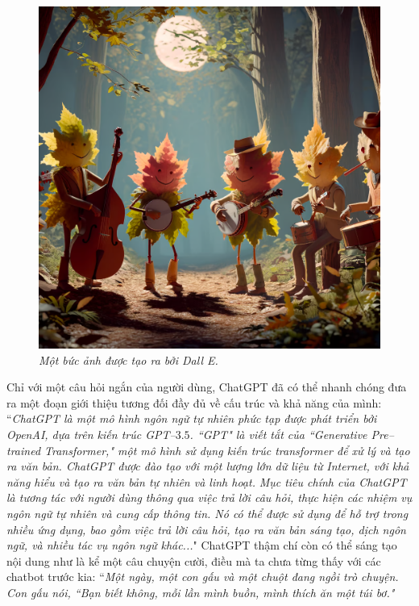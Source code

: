 \begin{multicols}{2}
\begin{figure}[H]
		\includegraphics[width= 1\linewidth]{leaf.png}
		\caption{\small\textit{\color{timhieukhoahoc}Một bức ảnh được tạo ra bởi Dall E.}}
		\vspace*{-10pt}
	\end{figure}
	Chỉ với một câu hỏi ngắn của người dùng, ChatGPT đã có thể nhanh chóng đưa ra một đoạn giới thiệu tương đối đầy đủ về cấu trúc và khả năng của mình:
	\vskip 0.1cm
	``\textit{ChatGPT là một mô hình ngôn ngữ tự nhiên phức tạp được phát triển bởi OpenAI, dựa trên kiến trúc GPT--$3.5$. ``GPT" là viết tắt của ``Generative Pre--trained Transformer," một mô hình sử dụng kiến trúc transformer để xử lý và tạo ra văn bản. ChatGPT được đào tạo với một lượng lớn dữ liệu từ Internet, với khả năng hiểu và tạo ra văn bản tự nhiên và linh hoạt.}
	\vskip 0.1cm
	\textit{Mục tiêu chính của ChatGPT là tương tác với người dùng thông qua việc trả lời câu hỏi, thực hiện các nhiệm vụ ngôn ngữ tự nhiên và cung cấp thông tin. Nó có thể được sử dụng để hỗ trợ trong nhiều ứng dụng, bao gồm việc trả lời câu hỏi, tạo ra văn bản sáng tạo, dịch ngôn ngữ, và nhiều tác vụ ngôn ngữ khác...}"
	\vskip 0.1cm
	ChatGPT thậm chí còn có thể  sáng tạo nội dung như là kể một câu chuyện cười, điều mà ta chưa từng thấy với các chatbot trước kia:
	\vskip 0.1cm
	``\textit{Một ngày, một con gấu và một chuột đang ngồi trò chuyện. Con gấu nói, ``Bạn biết không, mỗi lần mình buồn, mình thích ăn một túi bơ."}

\end{multicols}
